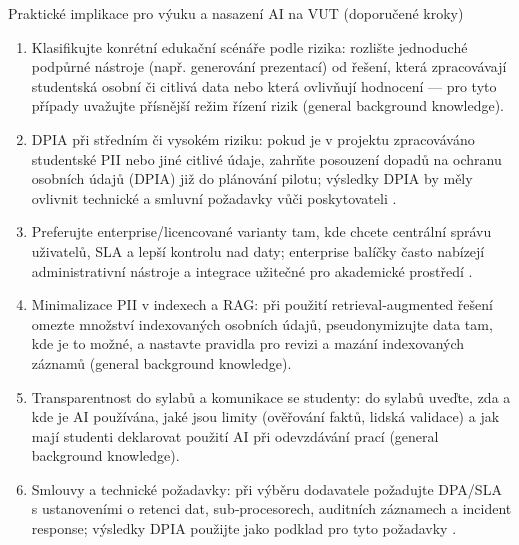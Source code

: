 Praktické implikace pro výuku a nasazení AI na VUT (doporučené kroky)
\begin{enumerate}
  \item Klasifikujte konrétní edukační scénáře podle rizika: rozlište jednoduché podpůrné nástroje (např. generování prezen­tací) od řešení, která zpracovávají studentská osobní či citlivá data nebo která ovlivňují hodnocení — pro tyto případy uvažujte přísnější režim řízení rizik (general background knowledge).
  \item DPIA při středním či vysokém riziku: pokud je v projektu zpracováváno studentské PII nebo jiné citlivé údaje, zahrňte posouzení dopadů na ochranu osobních údajů (DPIA) již do plánování pilotu; výsledky DPIA by měly ovlivnit technické a smluvní požadavky vůči poskytovateli \cite{kb_malinka_chatgpt_ve_vyuce_dva_roky_pote_2024_pdf_90bc3aaf_page_12_1}.
  \item Preferujte enterprise/licencované varianty tam, kde chcete centrální správu uživatelů, SLA a lepší kontrolu nad daty; enterprise balíčky často nabízejí administrativní nástroje a integrace užitečné pro akademické prostředí \cite{kb_ai_101_tipu_pdf_04e4a115_page_15_2}.
  \item Minimalizace PII v indexech a RAG: při použití retrieval‑augmented řešení omezte množství indexovaných osobních údajů, pseudonymizujte data tam, kde je to možné, a nastavte pravidla pro revizi a mazání indexovaných záznamů (general background knowledge).
  \item Transparentnost do sylabů a komunikace se studenty: do sylabů uveďte, zda a kde je AI používána, jaké jsou limity (ověřování faktů, lidská validace) a jak mají studenti deklarovat použití AI při odevzdávání prací (general background knowledge).
  \item Smlouvy a technické požadavky: při výběru dodavatele požadujte DPA/SLA s ustanoveními o retenci dat, sub‑procesorech, auditních záznamech a incident response; výsledky DPIA použijte jako podklad pro tyto požadavky \cite{kb_malinka_chatgpt_ve_vyuce_dva_roky_pote_2024_pdf_90bc3aaf_page_12_1}.
\end{enumerate}

